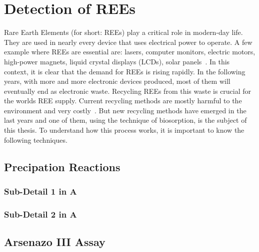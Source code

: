 \chapter{Detection of REEs\authorA{}}

Rare Earth Elements (for short: REEs) play a critical role in modern-day life.
They are used in nearly every device that uses electrical power to operate.
A few example where REEs are essential are: lasers, computer monitors, electric motors, high-power magnets, liquid crystal displays (LCDs), solar panels~\cite{usageofrees}.
In this context, it is clear that the demand for REEs is rising rapidly.
In the following years, with more and more electronic devices produced, most of them will eventually end as electronic waste.
Recycling REEs from this waste is crucial for the worlds REE supply.
Current recycling methods are mostly harmful to the environment and very costly~\cite{recyclingcurrent}.
But new recycling methods have emerged in the last years and one of them, using the technique of biosorption, is the subject of this thesis.
To understand how this process works, it is important to know the following techniques.


\section{Precipation Reactions}

\subsection{Sub-Detail 1 in A}

\subsection{Sub-Detail 2 in A}


\section{Arsenazo III Assay}
